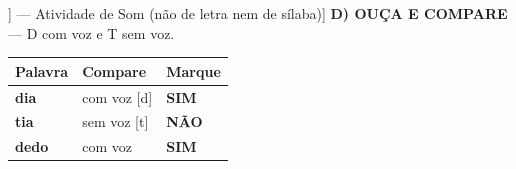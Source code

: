 \begin{exercicio}[Som /d/ [[d]] --- Atividade de Som (não de letra nem de sílaba)]
\textbf{D) OUÇA E COMPARE} --- D com voz e T sem voz.

\begin{center}
\begin{tabular}{@{}p{4.2cm}p{6.2cm}p{1.6cm}@{}}
\hline
\textbf{Palavra} & \textbf{Compare} & \textbf{Marque} \\
\hline
\textbf{dia} & com voz [d] & \textbf{SIM} \\
\textbf{tia} & sem voz [t] & \textbf{NÃO} \\
\textbf{dedo} & com voz & \textbf{SIM} \\
\hline
\end{tabular}
\end{center}

\end{exercicio}


